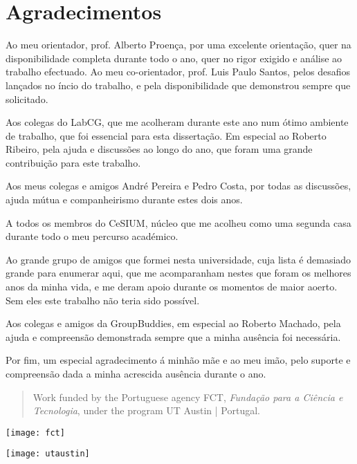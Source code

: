 \documentclass[main.tex]{subfiles}
\begin{document}
\chapter*{Agradecimentos}

Ao meu orientador, prof. Alberto Proença, por uma excelente orientação, quer na disponibilidade completa durante todo o ano, quer no rigor exigido e análise ao trabalho efectuado. Ao meu co-orientador, prof. Luis Paulo Santos, pelos desafios lançados no íncio do trabalho, e pela disponibilidade que demonstrou sempre que solicitado.

Aos colegas do LabCG, que me acolheram durante este ano num ótimo ambiente de trabalho, que foi essencial para esta dissertação. Em especial ao Roberto Ribeiro, pela ajuda e discussões ao longo do ano, que foram uma grande contribuição para este trabalho.

Aos meus colegas e amigos André Pereira e Pedro Costa, por todas as discussões, ajuda mútua e companheirismo durante estes dois anos.

A todos os membros do CeSIUM, núcleo que me acolheu como uma segunda casa durante todo o meu percurso académico.

Ao grande grupo de amigos que formei nesta universidade, cuja lista é demasiado grande para enumerar aqui, que me acomparanham  nestes que foram os melhores anos da minha vida, e me deram apoio durante os momentos de maior aoerto. Sem eles este trabalho não teria sido possível.

Aos colegas e amigos da GroupBuddies, em especial ao Roberto Machado, pela ajuda e compreensão demonstrada sempre que a minha ausência foi necessária.

Por fim, um especial agradecimento á minhão mãe e ao meu imão, pelo suporte e compreensão dada a minha acrescida ausência durante o ano.

\clearpage

\begin{quote}
  Work funded by the Portuguese agency FCT, \textit{Fundação para a Ciência e Tecnologia}, under the program UT Austin | Portugal.
\end{quote}

\begin{center}
  \texttt{[image: fct]}

  \texttt{[image: utaustin]}
\end{center}
\end{document}
